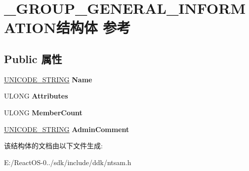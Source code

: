 \hypertarget{struct___g_r_o_u_p___g_e_n_e_r_a_l___i_n_f_o_r_m_a_t_i_o_n}{}\section{\+\_\+\+G\+R\+O\+U\+P\+\_\+\+G\+E\+N\+E\+R\+A\+L\+\_\+\+I\+N\+F\+O\+R\+M\+A\+T\+I\+O\+N结构体 参考}
\label{struct___g_r_o_u_p___g_e_n_e_r_a_l___i_n_f_o_r_m_a_t_i_o_n}
\subsection*{Public 属性}
\begin{DoxyCompactItemize}
\item 
\mbox{\label{struct___g_r_o_u_p___g_e_n_e_r_a_l___i_n_f_o_r_m_a_t_i_o_n_a5736e25ee1bd43bd69cf13768c55dfa7}} 
\hyperlink{struct___u_n_i_c_o_d_e___s_t_r_i_n_g}{U\+N\+I\+C\+O\+D\+E\+\_\+\+S\+T\+R\+I\+NG} {\bfseries Name}
\item 
\mbox{\label{struct___g_r_o_u_p___g_e_n_e_r_a_l___i_n_f_o_r_m_a_t_i_o_n_a78ae9b65b3936d3fca4645eef4d4c957}} 
U\+L\+O\+NG {\bfseries Attributes}
\item 
\mbox{\label{struct___g_r_o_u_p___g_e_n_e_r_a_l___i_n_f_o_r_m_a_t_i_o_n_af7f77b0cca9cf8ae904df20d4a342e9f}} 
U\+L\+O\+NG {\bfseries Member\+Count}
\item 
\mbox{\label{struct___g_r_o_u_p___g_e_n_e_r_a_l___i_n_f_o_r_m_a_t_i_o_n_a12d3c9a327ea850935ed1af1a257a7f5}} 
\hyperlink{struct___u_n_i_c_o_d_e___s_t_r_i_n_g}{U\+N\+I\+C\+O\+D\+E\+\_\+\+S\+T\+R\+I\+NG} {\bfseries Admin\+Comment}
\end{DoxyCompactItemize}


该结构体的文档由以下文件生成\+:\begin{DoxyCompactItemize}
\item 
E\+:/\+React\+O\+S-\/0../sdk/include/ddk/ntsam.\+h\end{DoxyCompactItemize}
